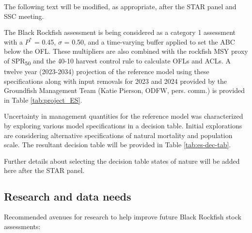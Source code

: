 \documentclass[11pt,
  english,
  letterpaper,
]{article}
\begin{document}
The following text will be modified, as appropriate, after the STAR panel and SSC meeting.

The Black Rockfish assessment is being considered as a category 1 assessment with a \(P^*\) = 0.45, \(\sigma\) = 0.50, and a time-varying buffer applied to set the ABC below the OFL. These multipliers are also combined with the rockfish MSY proxy of SPR\textsubscript{50} and the 40-10 harvest control rule to calculate OFLs and ACLs. A twelve year (2023-2034) projection of the reference model using these specifications along with input removals for 2023 and 2024 provided by the Groundfish Management Team (Katie Pierson, ODFW, pers. comm.) is provided in Table \ref{tab:project_ES}.



Uncertainty in management quantities for the reference model was characterized by exploring various model specifications in a decision table. Initial explorations are considering alternative specifications of natural mortality and population scale. The resultant decision table will be provided in Table \ref{tab:es-dec-tab}.

Further details about selecting the decision table states of nature will be added here after the STAR panel.

\clearpage



\clearpage

\hypertarget{research-and-data-needs}{%
\subsection*{Research and data needs}\label{research-and-data-needs}}

Recommended avenues for research to help improve future Black Rockfish stock assessments:
\end{document}
